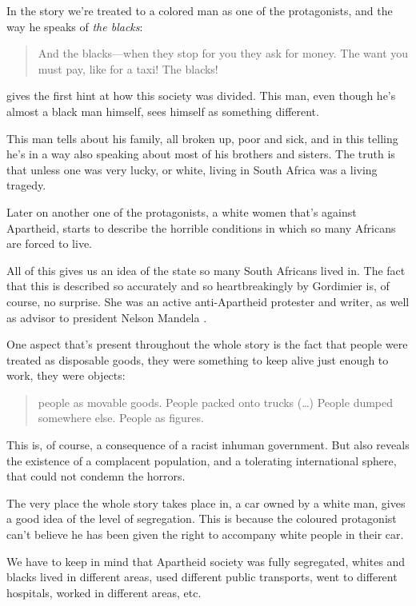In the story we're treated to a colored man as one of the protagonists,
and the way he speaks of \textit{the blacks}:
\begin{quote}
  And the blacks---when they stop for you they ask for money.
  The want you must pay, like for a taxi! The blacks! \cite[Page 213--214]{nadine_dreaming}
\end{quote}
gives the first hint at how this society was divided.
This man, even though he's almost a black man himself,
sees himself as something different.

This man tells about his family, all broken up, poor and sick,
and in this telling he's in a way also speaking
about most of his brothers and sisters.
The truth is that unless one was very lucky,
or white,
living in South Africa was a living tragedy.

Later on another one of the protagonists,
a white women that's against Apartheid,
starts to describe the horrible conditions in which
so many Africans are forced to live.

All of this gives us an idea of the state so many South Africans lived in.
The fact that this is described so accurately and so heartbreakingly
by Gordimier is, of course, no surprise. She was an active anti-Apartheid
protester and writer, as well as advisor to president Nelson Mandela \cite[Second paragraph]{noauthor_nadine_2021}.

One aspect that's present throughout the whole story
is the fact that people were treated as disposable goods,
they were something to keep alive just enough to work,
they were objects:
\begin{quote}
  people as movable goods. People packed onto trucks (\dots)
  People dumped somewhere else. People as figures. \cite[Page 219]{nadine_dreaming}
\end{quote}

This is, of course, a consequence of a racist inhuman government.
But also reveals the existence of a complacent population,
and a tolerating international sphere,
that could not condemn the horrors.

The very place the whole story takes place in,
a car owned by a white man,
gives a good idea of the level of segregation.
This is because the coloured protagonist
can't believe he has been given the right to accompany
white people in their car.

We have to keep in mind that Apartheid society was fully segregated,
whites and blacks lived in different areas, used different public transports,
went to different hospitals, worked in different areas, etc.

